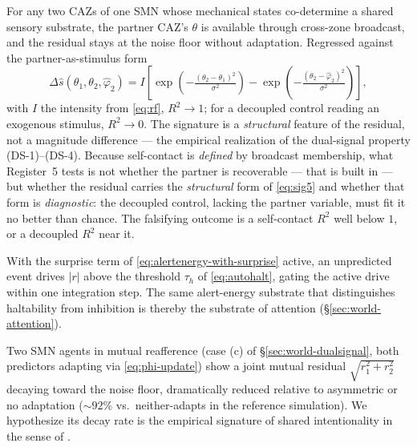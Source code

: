 \documentclass{article}
\begin{document}
\begin{description}[itemsep=4pt,labelindent=0pt,leftmargin=2em,
                    style=nextline]
\item[Register 5 (intra-body SMAP / dual-signal residual):]
For any two CAZs of one SMN whose mechanical states co-determine a shared
sensory substrate, the partner CAZ's $\theta$ is available through
cross-zone broadcast, and the residual stays at the noise floor without
adaptation.  Regressed against the partner-as-stimulus form
\begin{equation}
\Delta\hat s(\theta_1,\theta_2,\hat\varphi_2)
= I\!\left[\exp\!\left(-\tfrac{(\theta_2-\theta_1)^2}{\sigma^2}\right)
        - \exp\!\left(-\tfrac{(\theta_2-\hat\varphi_2)^2}{\sigma^2}\right)\right],
\label{eq:sig5}
\end{equation}
with $I$ the intensity from \eqref{eq:rf}, $R^2\to 1$; for a decoupled
control reading an exogenous stimulus, $R^2\to 0$.  The signature is a
\emph{structural} feature of the residual, not a magnitude difference ---
the empirical realization of the dual-signal property (DS-1)--(DS-4).
Because self-contact is \emph{defined} by broadcast membership, what
Register~5 tests is not whether the partner is recoverable --- that is
built in --- but whether the residual carries the \emph{structural} form
of \eqref{eq:sig5} and whether that form is \emph{diagnostic}: the
decoupled control, lacking the partner variable, must fit it no better than
chance.  The falsifying outcome is a self-contact $R^2$ well below $1$, or
a decoupled $R^2$ near it.

\item[Register 6 (surprise-driven attention and auto-halt):]
With the surprise term of \eqref{eq:alertenergy-with-surprise} active, an
unpredicted event drives $|r|$ above the threshold $\tau_h$ of
\eqref{eq:autohalt}, gating the active drive within one integration step.
The same alert-energy substrate that distinguishes haltability from
inhibition is thereby the substrate of attention
(\S\ref{sec:world-attention}).

\item[Register 7 (shared intentionality, hypothesis):]
Two SMN agents in mutual reafference (case (c) of
\S\ref{sec:world-dualsignal}, both predictors adapting via
\eqref{eq:phi-update}) show a joint mutual residual $\sqrt{r_1^2+r_2^2}$
decaying toward the noise floor, dramatically reduced relative to
asymmetric or no adaptation ($\sim 92\%$ vs.\ neither-adapts in the
reference simulation).  We hypothesize its decay rate is the empirical
signature of shared intentionality in the sense of
\citet{Tomasello2005Understanding}.


\end{description}
\end{document}
